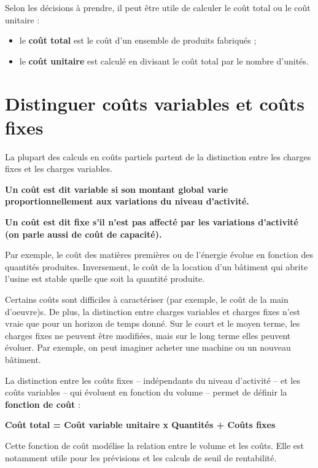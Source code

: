 \documentclass[oneside]{kaobook}
\begin{document}
Selon les décisions à prendre, il peut être utile de calculer le coût total ou le coût unitaire :
\begin{itemize}
\item le \textbf{coût total} est le coût d'un ensemble de produits fabriqués ;
\item le \textbf{coût unitaire} est calculé en divisant le coût total par le nombre d'unités.
\end{itemize}

\section{Distinguer coûts variables et coûts fixes}
\label{sec:orgf77edd9}
La plupart des calculs en coûts partiels partent de la distinction entre les charges fixes et les charges variables.
\begin{center}
\textbf{Un coût est dit variable si son montant global varie proportionnellement aux variations du niveau d'activité.}

\textbf{Un coût est dit fixe s'il n'est pas affecté par les variations d'activité (on parle aussi de coût de capacité).}
\end{center}

Par exemple, le coût des matières premières ou de l'énergie évolue en fonction des quantités produites. Inversement, le coût de la location d'un bâtiment qui abrite l'usine est stable quelle que soit la quantité produite.

Certains coûts sont difficiles à caractériser (par exemple, le coût de la main d'oeuvre)s. De plus, la distinction entre charges variables et charges fixes n'est vraie que pour un horizon de temps donné. Sur le court et le moyen terme, les charges fixes ne peuvent être modifiées, mais sur le long terme elles peuvent évoluer. Par exemple, on peut imaginer acheter une machine ou un nouveau bâtiment.

La distinction entre les coûts fixes – indépendants du niveau d'activité – et les coûts variables – qui évoluent en fonction du volume – permet de définir la \textbf{fonction de coût} :
\begin{center}
\textbf{Coût total = Coût variable unitaire x Quantités + Coûts fixes}
\end{center}
Cette fonction de coût modélise la relation entre le volume et les coûts. Elle est notamment utile pour les prévisions et les calculs de seuil de rentabilité.
\end{document}
